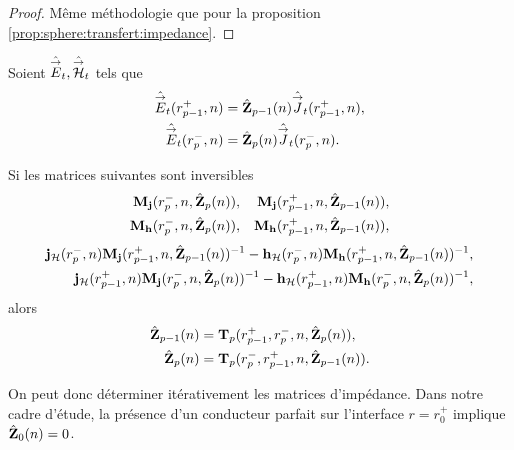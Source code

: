     \begin{proof}
      Même méthodologie que pour la proposition \ref{prop:sphere:transfert:impedance}.
    \end{proof}

    \begin{prop}%
      \label{prop:sphere:synthese:impedance}
      Soient \(\hat{{\overset{\rightarrow}{E}}}_t,\hat{{\overset{\rightarrow}{\mathcal{H}}}}_t\) tels que 
      \begin{align*}
      \hat{{\overset{\rightarrow}{E}}}_t(r_{p-1}^+,n) &= \hat{\mathbf{Z}}_{p-1}(n)\hat{{\overset{\rightarrow}{J}}}_t(r_{p-1}^+,n),
      \\
      \hat{{\overset{\rightarrow}{E}}}_t(r_{p}^-,n) &= \hat{\mathbf{Z}}_{p}(n)\hat{{\overset{\rightarrow}{J}}}_t(r_{p}^-,n).
      \end{align*}

      Si les matrices suivantes sont inversibles
      \begin{align*}
        \mathbf{M}_{\mathbf{j}}(r_p^-,n,\hat{\mathbf{Z}}_{p}(n)), && \mathbf{M}_{\mathbf{j}}(r_{p-1}^+,n,\hat{\mathbf{Z}}_{p-1}(n)),
        \\
        \mathbf{M}_{\mathbf{h}}(r_p^-,n,\hat{\mathbf{Z}}_{p}(n)), && \mathbf{M}_{\mathbf{h}}(r_{p-1}^+,n,\hat{\mathbf{Z}}_{p-1}(n)),
      \end{align*}
      \begin{align*}
        \mathbf{j}_{\mathcal{H}}(r_{p}^-,n)\mathbf{M}_{\mathbf{j}}(r_{p-1}^+,n,\hat{\mathbf{Z}}_{p-1}(n))^{-1} - \mathbf{h}_{\mathcal{H}}(r_{p}^-,n)\mathbf{M}_{\mathbf{h}}(r_{p-1}^+,n,\hat{\mathbf{Z}}_{p-1}(n))^{-1},
        \\
        \mathbf{j}_{\mathcal{H}}(r_{p-1}^+,n)\mathbf{M}_{\mathbf{j}}(r_{p}^-,n,\hat{\mathbf{Z}}_{p}(n))^{-1} - \mathbf{h}_{\mathcal{H}}(r_{p-1}^+,n)\mathbf{M}_{\mathbf{h}}(r_{p}^-,n,\hat{\mathbf{Z}}_{p}(n))^{-1},
      \end{align*}
      alors 
      \begin{align*}
        \hat{\mathbf{Z}}_{p-1}(n) &= \mathbf{T}_p(r_{p-1}^+,r_{p}^-,n,\hat{\mathbf{Z}}_{p}(n)),
        \\
        \hat{\mathbf{Z}}_{p}(n) &= \mathbf{T}_p(r_{p}^-,r_{p-1}^+,n,\hat{\mathbf{Z}}_{p-1}(n)).
      \end{align*}

    \end{prop}

    On peut donc déterminer itérativement les matrices d'impédance. Dans notre cadre d'étude, la présence d'un conducteur parfait sur l'interface \(r=r_0^+\) implique \(\hat{\mathbf{Z}}_{0}(n) = 0\).


